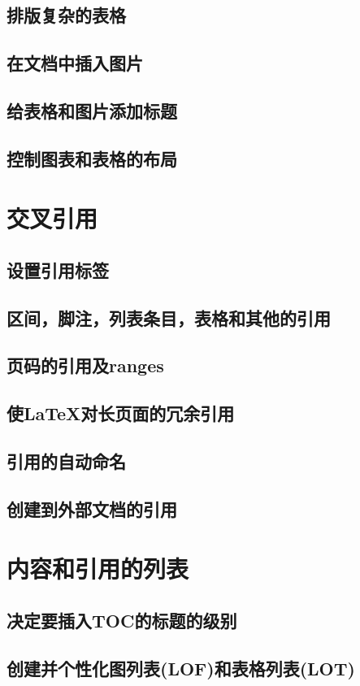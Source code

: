 \documentclass{book}
\begin{document}
	\section{排版复杂的表格}
	\section{在文档中插入图片}
	\section{给表格和图片添加标题}
	\section{控制图表和表格的布局}
\chapter{交叉引用}
	\section{设置引用标签}
	\section{区间，脚注，列表条目，表格和其他的引用}
	\section{页码的引用及ranges}
	\section{使LaTeX对长页面的冗余引用}
	\section{引用的自动命名}
	\section{创建到外部文档的引用}
\chapter{内容和引用的列表}
	\section{决定要插入TOC的标题的级别}
	\section{创建并个性化图列表(LOF)和表格列表(LOT)}
\end{document}

